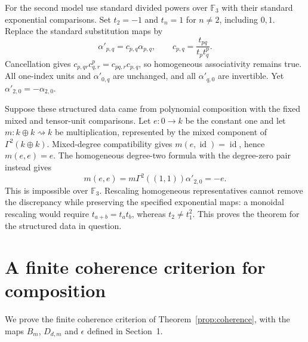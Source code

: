 \documentclass[11pt,a4paper]{article}
\theoremstyle{definition}
\newcommand{\id}{\operatorname{id}}
\newcommand{\F}{\mathbb F}
\begin{document}
For the second model use standard divided powers over $\F_3$ with their standard exponential comparisons. Set $t_2=-1$ and $t_n=1$ for $n\ne2$, including $0,1$. Replace the standard substitution maps by
\[
 \alpha'_{p,q}=c_{p,q}\alpha_{p,q},\qquad
 c_{p,q}=\frac{t_{pq}}{t_p t_q^p}.
\]
Cancellation gives $c_{p,qr}c_{q,r}^p=c_{pq,r}c_{p,q}$, so homogeneous associativity remains true. All one-index units and $\alpha'_{0,q}$ are unchanged, and all $\alpha'_{q,0}$ are invertible. Yet $\alpha'_{2,0}=-\alpha_{2,0}$.

Suppose these structured data came from polynomial composition with the fixed mixed and tensor-unit comparisons. Let $e:0\to k$ be the constant one and let $m:k\oplus k\rightsquigarrow k$ be multiplication, represented by the mixed component of $\Gamma^2(k\oplus k)$. Mixed-degree compatibility gives $m(e,\id)=\id$, hence $m(e,e)=e$. The homogeneous degree-two formula with the degree-zero pair instead gives
\[
 m(e,e)=m\Gamma^2((1,1))\alpha'_{2,0}=-e.
\]
This is impossible over $\F_3$. Rescaling homogeneous representatives cannot remove the discrepancy while preserving the specified exponential maps: a monoidal rescaling would require $t_{a+b}=t_at_b$, whereas $t_2\ne t_1^2$. This proves the theorem for the structured data in question.

\section{A finite coherence criterion for composition}\label{sec:coherence}
We prove the finite coherence criterion of Theorem~\ref{prop:coherence}, with the maps $B_m$, $D_{d,m}$ and $\epsilon$ defined in Section~1.
\end{document}
